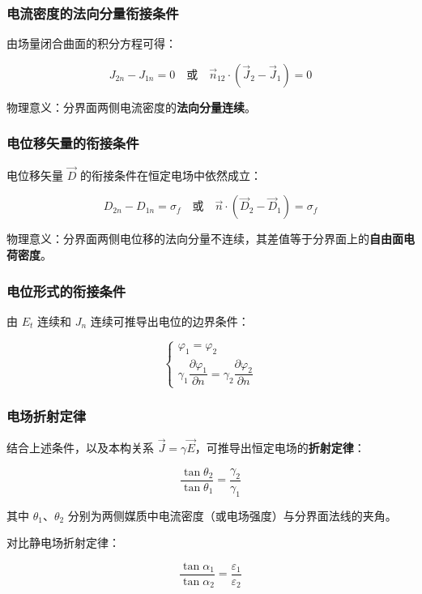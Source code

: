 \subsubsection{电流密度的法向分量衔接条件}
由场量闭合曲面的积分方程可得：
\begin{formulaBox}
\[
J_{2n} - J_{1n} = 0 \quad \text{或} \quad \vec{n}_{12} \cdot (\vec{J}_2 - \vec{J}_1) = 0
\]
\end{formulaBox}
物理意义：分界面两侧电流密度的\textbf{法向分量连续}。

\subsubsection{电位移矢量的衔接条件}
电位移矢量 $\vec{D}$ 的衔接条件在恒定电场中依然成立：
\begin{formulaBox}
\[
D_{2n} - D_{1n} = \sigma_f \quad \text{或} \quad \vec{n} \cdot (\vec{D}_2 - \vec{D}_1) = \sigma_f
\]
\end{formulaBox}
物理意义：分界面两侧电位移的法向分量不连续，其差值等于分界面上的\textbf{自由面电荷密度}。

\subsubsection{电位形式的衔接条件}
由 $E_t$ 连续和 $J_n$ 连续可推导出电位的边界条件：
\begin{formulaBox}
\[
\begin{cases}
\varphi_1 = \varphi_2 \\
\gamma_1 \dfrac{\partial \varphi_1}{\partial n} = \gamma_2 \dfrac{\partial \varphi_2}{\partial n}
\end{cases}
\]
\end{formulaBox}

\subsubsection{电场折射定律}
结合上述条件，以及本构关系 $\vec{J} = \gamma \vec{E}$，可推导出恒定电场的\textbf{折射定律}：
\begin{formulaBox}
\[
\frac{\tan\theta_2}{\tan\theta_1} = \frac{\gamma_2}{\gamma_1}
\]
\end{formulaBox}
其中 $\theta_1$、$\theta_2$ 分别为两侧媒质中电流密度（或电场强度）与分界面法线的夹角。

\noindent 对比静电场折射定律：
\begin{formulaBox}
\[
\frac{\tan\alpha_1}{\tan\alpha_2} = \frac{\varepsilon_1}{\varepsilon_2}
\]
\end{formulaBox}

